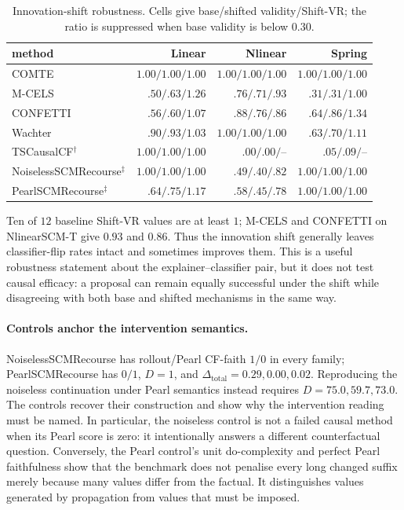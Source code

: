 \documentclass{article}
\newcommand{\dototal}{\Delta_{\mathrm{total}}}
\begin{document}
\begin{table}[t]
  \centering
  \scriptsize
  \caption{Innovation-shift robustness.  Cells give base/shifted validity/Shift-VR; the ratio is suppressed when base validity is below $0.30$.}
  \label{tab:shift-results}
  \setlength{\tabcolsep}{4pt}
  \begin{tabular}{@{}lrrr@{}}
    \toprule
    method & Linear & Nlinear & Spring \\
    \midrule
    COMTE & $1.00/1.00/1.00$ & $1.00/1.00/1.00$ & $1.00/1.00/1.00$ \\
    M-CELS & $.50/.63/1.26$ & $.76/.71/.93$ & $.31/.31/1.00$ \\
    CONFETTI & $.56/.60/1.07$ & $.88/.76/.86$ & $.64/.86/1.34$ \\
    Wachter & $.90/.93/1.03$ & $1.00/1.00/1.00$ & $.63/.70/1.11$ \\
    TSCausalCF$^{\dagger}$ & $1.00/1.00/1.00$ & $.00/.00/\text{--}$ & $.05/.09/\text{--}$ \\
    NoiselessSCMRecourse$^{\ddagger}$ & $1.00/1.00/1.00$ & $.49/.40/.82$ & $1.00/1.00/1.00$ \\
    PearlSCMRecourse$^{\ddagger}$ & $.64/.75/1.17$ & $.58/.45/.78$ & $1.00/1.00/1.00$ \\
    \bottomrule
  \end{tabular}
\end{table}

Ten of $12$ baseline Shift-VR values are at least $1$; M-CELS and CONFETTI on NlinearSCM-T give $0.93$ and $0.86$.  Thus the innovation shift generally leaves classifier-flip rates intact and sometimes improves them.  This is a useful robustness statement about the explainer--classifier pair, but it does not test causal efficacy: a proposal can remain equally successful under the shift while disagreeing with both base and shifted mechanisms in the same way.

\paragraph{Controls anchor the intervention semantics.}
\label{sec:res-controls}

NoiselessSCMRecourse has rollout/Pearl CF-faith $1/0$ in every family; PearlSCMRecourse has $0/1$, $D=1$, and $\dototal=0.29,0.00,0.02$. Reproducing the noiseless continuation under Pearl semantics instead requires $D=75.0,59.7,73.0$.  The controls recover their construction and show why the intervention reading must be named.  In particular, the noiseless control is not a failed causal method when its Pearl score is zero: it intentionally answers a different counterfactual question.  Conversely, the Pearl control's unit do-complexity and perfect Pearl faithfulness show that the benchmark does not penalise every long changed suffix merely because many values differ from the factual.  It distinguishes values generated by propagation from values that must be imposed.
\end{document}
